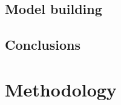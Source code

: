 \documentclass[12pt]{article}
\begin{document}
\subsection{Model building}


\subsection{Conclusions}

\section{Methodology} 







\end{document}
